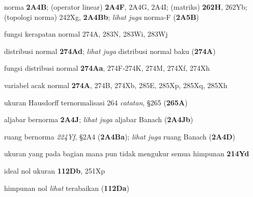 norma {\bf 2A4B};
  (operator linear) {\bf 2A4F}, 2A4G, 2A4I;
  (matriks) {\bf 262H}, 262Yb;
  (topologi norma) 242Xg, {\bf 2A4Bb};
  {\it lihat juga}
    norma-F ({\bf 2A5B})


fungsi kerapatan normal 274A, 283N, 283Wi, 283Wj


distribusi normal {\bf 274Ad};
{\it lihat juga} distribusi normal baku ({\bf 274A})


fungsi distribusi normal {\bf 274Aa},
274F-274K, 
274M, 274Xf, 274Xh












variabel acak normal {\bf 274A}, 274B, 274Xb,
285E, 285Xp, 285Xq, 285Xh


















ukuran Hausdorff ternormalisasi 264 {\it catatan},
\S265 ({\bf 265A})




aljabar bernorma {\bf 2A4J};  
  {\it lihat juga} aljabar Banach ({\bf 2A4Jb})


ruang bernorma {\it 224Yf}, \S2A4 ({\bf 2A4Ba}); 
  {\it lihat juga} ruang Banach ({\bf 2A4D})












ukuran yang pada bagian mana pun tidak mengukur semua himpunan {\bf 214Yd}
















ideal nol ukuran {\bf 112Db},
  251Xp




himpunan nol {\it lihat} terabaikan ({\bf 112Da})


